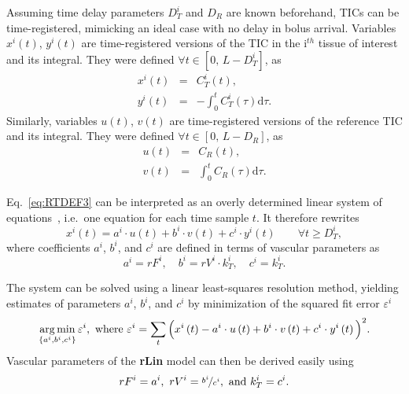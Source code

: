 Assuming time delay parameters $D_T^i$ and $D_R$ are known beforehand, TICs can be time-registered, mimicking an ideal case with no delay in bolus arrival.
Variables $x^i\left(t\right)$, $y^i\left(t\right)$ are time-registered versions of the TIC in the i$^{th}$ tissue of interest and its integral.
They were defined $\forall t \in \left[ 0,\,L-D_T^i\right]$, as
\begin{equation}
\begin{array}{rcl}
x^i\left(t\right) &=& C_{T}^i\left(t\right), \\
y^i\left(t\right) &=& -\int_0^{t} C_{T}^i \left( \tau \right) \mathrm d\tau.
\end{array}
\label{eq:RTLINV1}
\end{equation}
Similarly, variables $u\left(t\right)$, $v\left(t\right)$ are time-registered versions of the reference TIC and its integral.
They were defined $\forall t \in \left[ 0,\,L-D_R\right]$, as
\begin{equation}
\begin{array}{rcl}
u\left(t\right) &=& C_{R}\left(t\right), \\
v\left(t\right) &=& \int_0^t C_{R} \left(\tau\right) \mathrm d\tau.
\end{array}
\label{eq:RTLINV2}
\end{equation}

Eq.~\ref{eq:RTDEF3} can be interpreted as an overly determined linear system of equations~\cite{Bjorck1996}, i.e.~one equation for each time sample $t$.
It therefore rewrites
\begin{equation}
x^i\left(t\right) = a^i \cdot u\left(t\right) + b^i \cdot v\left(t\right) + c^i \cdot y^i\left(t\right) \qquad \forall t \geq D_T^i,
\label{eq:RTLINF}
\end{equation}
where coefficients $a^i$, $b^i$, and $c^i$ are defined in terms of vascular parameters as
\begin{equation}
a^i = rF^i, \quad b^i = rV^i \cdot k_T^i, \quad c^i = k_T^i.
\label{eq:RTLINC}
\end{equation}

The system can be solved using a linear least-squares resolution method, yielding estimates of parameters $a^i$, $b^i$, and $c^i$ by minimization of the squared fit error $\varepsilon^i$
\begin{equation}
\operatorname*{arg\,min}_{\left\lbrace a^i, b^i, c^i\right\rbrace} \varepsilon^i, \textrm{ where } \varepsilon^i = \sum_t \Big( x^i\left(t\right) - a^i\cdot u\left(t\right) + b^i\cdot v\left(t\right) + c^i\cdot y^i\left(t\right) \Big)^2.
\end{equation}
Vascular parameters of the \textbf{rLin} model can then be derived easily using
\begin{equation}
rF^i = a^i,~rV^i = \nicefrac{b^i}{c^i}, \textrm{ and } k_T^i = c^i.
\end{equation}

